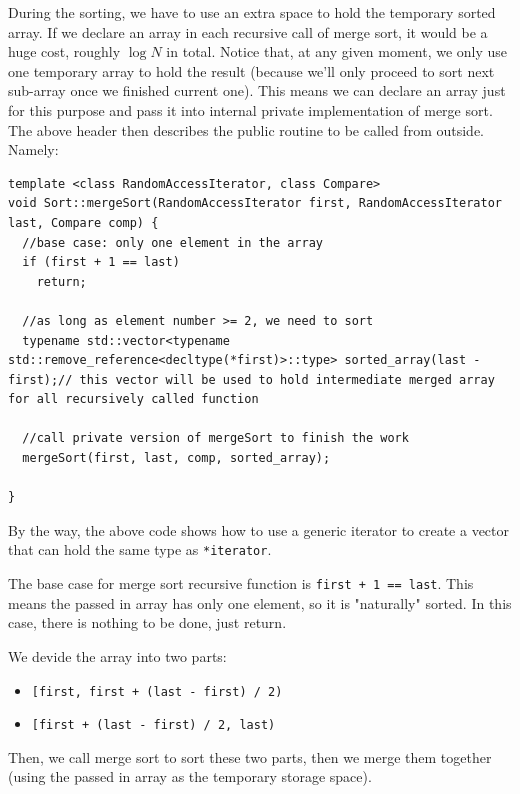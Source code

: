 \documentclass[12pt]{book}
\begin{document}
During the sorting, we have to use an extra space to hold the temporary sorted array. If we declare an array in each recursive call of merge sort, it would be a huge cost, roughly \(\log{N}\) in total. Notice that, at any given moment, we only use one temporary array to hold the result (because we'll only proceed to sort next sub-array once we finished current one). This means we can declare an array just for this purpose and pass it into internal private implementation of merge sort. The above header then describes the public routine to be called from outside. Namely:
\begin{verbatim}
template <class RandomAccessIterator, class Compare>
void Sort::mergeSort(RandomAccessIterator first, RandomAccessIterator last, Compare comp) {
  //base case: only one element in the array
  if (first + 1 == last)
    return;

  //as long as element number >= 2, we need to sort
  typename std::vector<typename std::remove_reference<decltype(*first)>::type> sorted_array(last - first);// this vector will be used to hold intermediate merged array for all recursively called function 

  //call private version of mergeSort to finish the work 
  mergeSort(first, last, comp, sorted_array);

}

\end{verbatim}
By the way, the above code shows how to use a generic iterator to create a vector that can hold the same type as \texttt{*iterator}.

The base case for merge sort recursive function is \texttt{first + 1 == last}. This means the passed in array has only one element, so it is "naturally" sorted. In this case, there is nothing to be done, just return.

We devide the array into two parts:
\begin{itemize}
\item \texttt{[first, first + (last - first) / 2)}
\item \texttt{[first + (last - first) / 2, last)}
\end{itemize}
Then, we call merge sort to sort these two parts, then we merge them together (using the passed in array as the temporary storage space).
\end{document}
